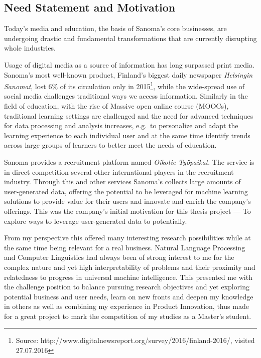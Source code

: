 
\subsection{Need Statement and Motivation}

Today's media and education, the basis of Sanoma's core businesses, are undergoing drastic and fundamental transformations that are currently disrupting whole industries.

Usage of digital media as a source of information has long surpassed print media. Sanoma's most well-known product, Finland's biggest daily newspaper \emph{Helsingin Sanomat}, lost 6\% of its circulation only in 2015\footnote{Source: http://www.digitalnewsreport.org/survey/2016/finland-2016/, visited 27.07.2016}, while the wide-spread use of social media challenges traditional ways we access information. Similarly in the field of education, with the rise of Massive open online course (MOOCs), traditional learning settings are challenged and the need for advanced techniques for data processing and analysis increases, e.g.\ to personalize and adapt the learning experience to each individual user and at the same time identify trends across large groups of learners to better meet the needs of education.

Sanoma provides a recruitment platform named \emph{Oikotie Työpaikat}. The service is in direct competition several other international players in the recruitment industry. Through this and other services Sanoma's collects large amounts of user-generated data, offering the potential to be leveraged for machine learning solutions to provide value for their users and innovate and enrich the company's offerings.
This was the company's initial motivation for this thesis project --- To explore ways to leverage user-generated data to potentially.

From my perspective this offered many interesting research possibilities while at the same time being relevant for a real business. Natural Language Processing and Computer Linguistics had always been of strong interest to me for the complex nature and yet high interpretability of problems and their proximity and relatedness to progress in universal machine intelligence. This presented me with the challenge position to balance pursuing research objectives and yet exploring potential business and user needs, learn on new fronts and deepen my knowledge in others as well as combining my experience in Product Innovation, thus made for a great project to mark the competition of my studies as a Master's student.

